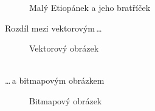 \documentclass[a4paper,11pt]{article}[20-03-2022]
\begin{document}
\begin{figure}[!h]
{        
    }
    \caption{Malý Etiopánek a jeho bratříček}
    \label{pic1}
\end{figure}

\newpage
Rozdíl mezi vektorovým\,\dots
\begin{figure}[!h]
    \centering
    \caption{Vektorový obrázek}
    \label{pic2}
\end{figure}
\bigskip
\\\dots\,a bitmapovým obrázkem
\begin{figure}[!h]
    \centering
    \caption{Bitmapový obrázek}
    \label{pic3}
\end{figure}
\bigskip
\end{document}
